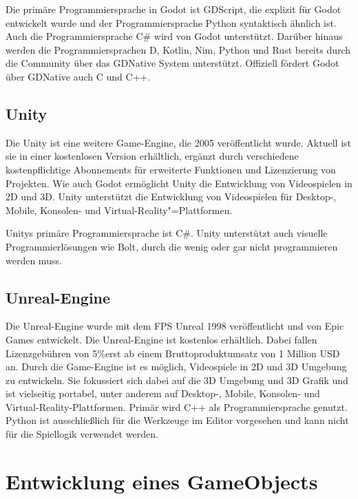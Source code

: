 Die prim\"{a}re Programmiersprache in Godot ist GDScript, die explizit f\"{u}r Godot entwickelt wurde und der Programmiersprache Python syntaktisch \"{a}hnlich ist. Auch die Programmiersprache C# wird von Godot unterst\"{u}tzt. Dar\"{u}ber hinaus werden die Programmiersprachen D, Kotlin, Nim, Python und Rust bereits durch die Community \"{u}ber das GDNative System unterst\"{u}tzt. Offiziell f\"{o}rdert Godot \"{u}ber GDNative auch C und C++. \autocite{gdnative}

\subsection{Unity}
\label{chap:unity}


Die Unity ist eine weitere Game-Engine, die 2005 ver\"{o}ffentlicht wurde. Aktuell ist sie in einer kostenlosen Version erh\"{a}ltlich, erg\"{a}nzt durch verschiedene kostenpflichtige Abonnements f\"{u}r erweiterte Funktionen und Lizenzierung von Projekten. \autocite{uabos} Wie auch Godot erm\"{o}glicht Unity die Entwicklung von Videospielen in 2D und 3D. Unity unterst\"{u}tzt die Entwicklung von Videospielen f\"{u}r Desktop-, Mobile, Konsolen- und Virtual-Reality"=Plattformen.

Unitys prim\"{a}re Programmiersprache ist C#. Unity unterst\"{u}tzt auch visuelle Programmierl\"{o}sungen wie Bolt, durch die wenig oder gar nicht programmieren werden muss. \autocite{unitybolt}

\subsection{Unreal-Engine}
\label{chap:unreal-engine}

Die Unreal-Engine wurde mit dem FPS Unreal 1998 ver\"{o}ffentlicht und von Epic Games entwickelt. Die Unreal-Engine ist kostenlos erh\"{a}ltlich. Dabei fallen Lizenzgeb\"{u}hren von 5\%erst ab einem Bruttoproduktumsatz von 1 Million USD an. \autocite{ul} Durch die Game-Engine ist es m\"{o}glich, Videospiele in 2D und 3D Umgebung zu entwickeln. Sie fokussiert sich dabei auf die 3D Umgebung und 3D Grafik und ist vielseitig portabel, unter anderem auf Desktop-, Mobile, Konsolen- und Virtual-Reality-Plattformen. 
Prim\"{a}r wird C++ als Programmiersprache genutzt. Python ist ausschlie\ss{}lich f\"{u}r die Werkzeuge im Editor vorgesehen und kann nicht f\"{u}r die Spiellogik verwendet werden. \autocite{ueps}


\section{Entwicklung eines GameObjects}
\label{chap:komponenten}

